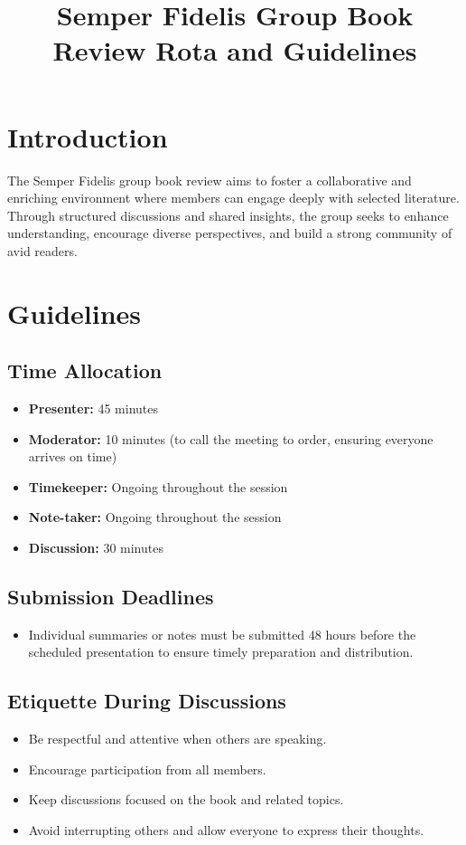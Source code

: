 \documentclass[10pt]{article}
\title{\textbf{Semper Fidelis Group Book Review Rota and Guidelines}}
\date{}
\begin{document}
\maketitle

\section*{Introduction}
The Semper Fidelis group book review aims to foster a collaborative and enriching environment where members can engage deeply with selected literature. Through structured discussions and shared insights, the group seeks to enhance understanding, encourage diverse perspectives, and build a strong community of avid readers.

\section*{Guidelines}

\subsection*{Time Allocation}
\begin{itemize}
    \item \textbf{Presenter:} 45 minutes
    \item \textbf{Moderator:} 10 minutes (to call the meeting to order, ensuring everyone arrives on time)
    \item \textbf{Timekeeper:} Ongoing throughout the session
    \item \textbf{Note-taker:} Ongoing throughout the session
    \item \textbf{Discussion:} 30 minutes
\end{itemize}

\subsection*{Submission Deadlines}
\begin{itemize}
    \item Individual summaries or notes must be submitted 48 hours before the scheduled presentation to ensure timely preparation and distribution.
\end{itemize}

\subsection*{Etiquette During Discussions}
\begin{itemize}
    \item Be respectful and attentive when others are speaking.
    \item Encourage participation from all members.
    \item Keep discussions focused on the book and related topics.
    \item Avoid interrupting others and allow everyone to express their thoughts.
\end{itemize}
\end{document}
